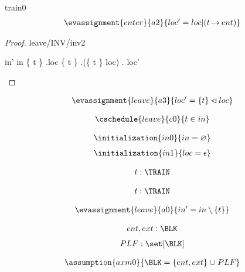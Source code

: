 \documentclass[12pt]{amsart}
\begin{document}
\begin{machine}{train0}
\begin{align*}
\evassignment{enter}{a2}
{	loc' = loc | (t \tfun ent)	}
\end{align*}

\begin{proof}{leave/INV/inv2}
	\begin{calculation}
		in'
	\hint{=}{ \ref{a0} }
		in \setminus \{ t \}
	\hint{=}{ \ref{inv2} }
		\dom.loc \setminus \{ t \}
		\dom.(\{ t \} \domsub loc)
	\hint{=}{ \ref{a3} } 
		\dom. loc' 
	\end{calculation}
\end{proof}

\begin{align*}
\evassignment{leave}{a3}
{	loc' = \{ t \} \domsub loc 	}
\end{align*}

\begin{align*}
\cschedule{leave}{c0}
{	t \in in	}
\end{align*}

\begin{align*}
\initialization{in0}
{	in = \emptyset	}
\end{align*}
\begin{align*}
\initialization{in1}
{	loc = \emptyfun	}
\end{align*}

\withsets{\TRAIN}
\withsets{\LOC}
\withsets{\BLK}
\withfun{\TRAIN}{\BLK}

\begin{align*}
\indices{leave}{	t: \TRAIN}
\end{align*}

\begin{align*}
\indices{enter}{	t: \TRAIN}
\end{align*}

\begin{align*}
\evassignment{leave}{a0}
{	in' = in \setminus \{ t \}	}
\end{align*}

\begin{align*}
\constant{	ent,ext : \BLK}
\end{align*}
\begin{align*}
\constant{	PLF : \set [\BLK]}
\end{align*}

\begin{align*}\assumption{axm0}
{	\BLK = \{ ent, ext \} \bunion PLF }
\end{align*}


\end{machine}
\end{document}
